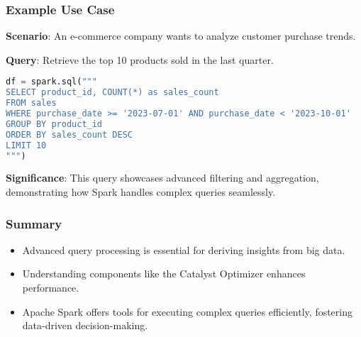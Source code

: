 \documentclass[aspectratio=169]{beamer}
\begin{document}
\begin{frame}[fragile]
    \frametitle{Example Use Case}
    
    \textbf{Scenario}: An e-commerce company wants to analyze customer purchase trends.
    
    \textbf{Query}: Retrieve the top 10 products sold in the last quarter.
    
    \begin{lstlisting}[language=Python]
df = spark.sql("""
SELECT product_id, COUNT(*) as sales_count
FROM sales
WHERE purchase_date >= '2023-07-01' AND purchase_date < '2023-10-01'
GROUP BY product_id
ORDER BY sales_count DESC
LIMIT 10
""")
    \end{lstlisting}
    
    \textbf{Significance}: This query showcases advanced filtering and aggregation, demonstrating how Spark handles complex queries seamlessly.
\end{frame}

\begin{frame}[fragile]
    \frametitle{Summary}
    
    \begin{itemize}
        \item Advanced query processing is essential for deriving insights from big data.
        \item Understanding components like the Catalyst Optimizer enhances performance.
        \item Apache Spark offers tools for executing complex queries efficiently, fostering data-driven decision-making.
    \end{itemize}
    
\end{frame}
\end{document}
